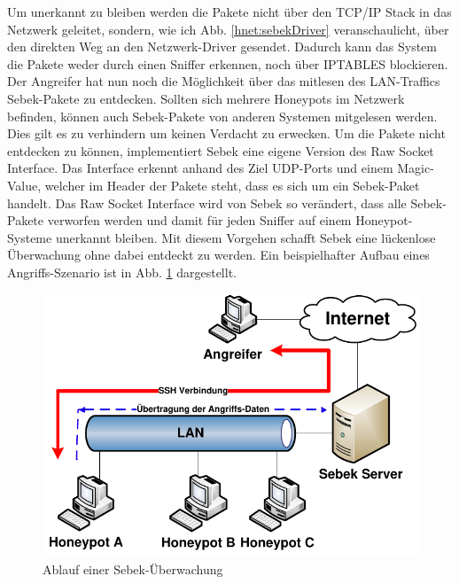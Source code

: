 Um unerkannt zu bleiben werden die Pakete nicht über den TCP/IP Stack in das Netzwerk geleitet, sondern, wie ich Abb. \ref{hnet:sebekDriver} veranschaulicht, über den direkten Weg an den Netzwerk-Driver gesendet. Dadurch kann das System die Pakete weder durch einen Sniffer erkennen, noch über IPTABLES blockieren.
Der Angreifer hat nun noch die Möglichkeit über das mitlesen des LAN-Traffics Sebek-Pakete zu entdecken. Sollten sich mehrere Honeypots im Netzwerk befinden, können auch Sebek-Pakete von anderen Systemen mitgelesen werden. Dies gilt es zu verhindern um keinen Verdacht zu erwecken. Um die Pakete nicht entdecken zu können, implementiert Sebek eine eigene Version des Raw Socket Interface. Das Interface erkennt anhand des Ziel UDP-Ports und einem \grqq Magic-Value\grqq, welcher im Header der Pakete steht, dass es sich um ein Sebek-Paket handelt. Das Raw Socket Interface wird von Sebek so verändert, dass alle Sebek-Pakete verworfen werden und damit für jeden Sniffer auf einem Honeypot-Systeme unerkannt bleiben. Mit diesem Vorgehen schafft Sebek eine lückenlose Überwachung ohne dabei entdeckt zu werden. Ein beispielhafter Aufbau eines Angriffs-Szenario ist in Abb. \ref{hnet:sebekAufbau} dargestellt.\cite{project.2003b}
\begin{figure}[ht]
    \centering\includegraphics[scale=0.70]{Bilder/sebek_Aufbau.pdf}
  \caption{Ablauf einer Sebek-Überwachung\cite{project.2003b}}
  \label{hnet:sebekAufbau}
\end{figure}

